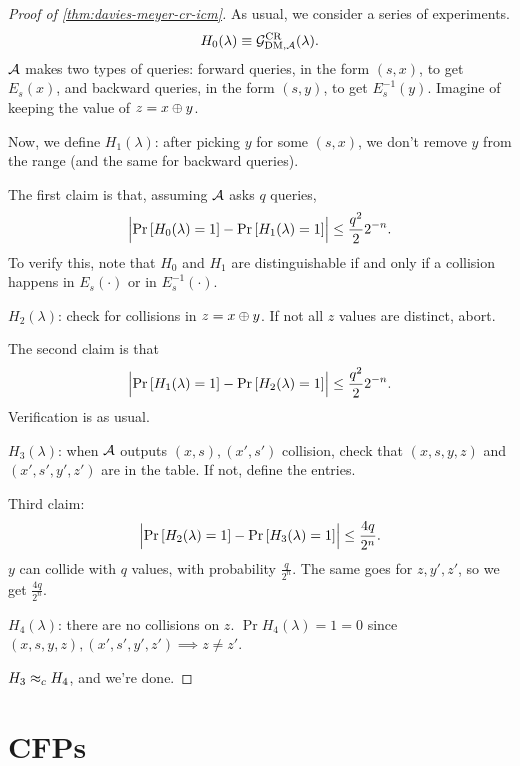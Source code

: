 \begin{proof}[Proof of \cref{thm:davies-meyer-cr-icm}]
	As usual, we consider a series of experiments.
	\begin{equation*}
		H_0(\lambda) \equiv \mathcal{G}^{\scriptstyle \text{CR}}_{{\scriptstyle \text{DM}}, \mathcal{A}}(\lambda).
	\end{equation*}
	$\mathcal{A}$ makes two types of queries: forward queries, in the form $(s,x)$, to get $E_s(x)$, and backward queries, in the form $(s,y)$, to get $E^{-1}_s(y)$.
	Imagine of keeping the value of $z = x \oplus y$.

	Now, we define $H_1(\lambda)$: after picking $y$ for some $(s,x)$, we don't remove $y$ from the range (and the same for backward queries).

	The first claim is that, assuming $\mathcal{A}$ asks $q$ queries,
	\begin{equation*}
		\left|{\mathop{\mathrm{Pr}}\limits_{} \left[ {H_0(\lambda) = 1} \right] - \mathop{\mathrm{Pr}}\limits_{} \left[ {H_1(\lambda) = 1} \right]}\right| \le \frac{q^2}{2} 2^{-n}.
	\end{equation*}
	To verify this, note that $H_0$ and $H_1$ are distinguishable if and only if a collision happens in $E_s(\cdot)$ or in $E^{-1}_s(\cdot)$.

	$H_2(\lambda)$: check for collisions in $z = x \oplus y$.
	If not all $z$ values are distinct, abort.

	The second claim is that
	\begin{equation*}
		\left|{\mathop{\mathrm{Pr}}\limits_{} \left[ {H_1(\lambda) = 1} \right] - \mathop{\mathrm{Pr}}\limits_{} \left[ {H_2(\lambda) = 1} \right]}\right| \le \frac{q^2}{2} 2^{-n}.
	\end{equation*}
	Verification is as usual.

	$H_3(\lambda)$: when $\mathcal{A}$ outputs $(x,s), (x',s')$ collision, check that $(x,s,y,z)$ and $(x',s',y',z')$ are in the table.
	If not, define the entries.

	Third claim:
	\begin{equation*}
		\left|{\mathop{\mathrm{Pr}}\limits_{} \left[ {H_2(\lambda) = 1} \right] - \mathop{\mathrm{Pr}}\limits_{} \left[ {H_3(\lambda) = 1} \right]}\right| \le \frac{4 q}{2^n}.
	\end{equation*}
	$y$ can collide with $q$ values, with probability $\frac{q}{2^n}$.
	The same goes for $z, y', z'$, so we get $\frac{4 q}{2^n}$.

	$H_4(\lambda)$: there are no collisions on $z$.
	$\Pr{H_4(\lambda) = 1} = 0$ since $(x,s,y,z), (x',s',y',z') \implies z \neq z'$.

	$H_3 \approx_c H_4$, and we're done.
\end{proof}

\section{\aclp{CFP}}

